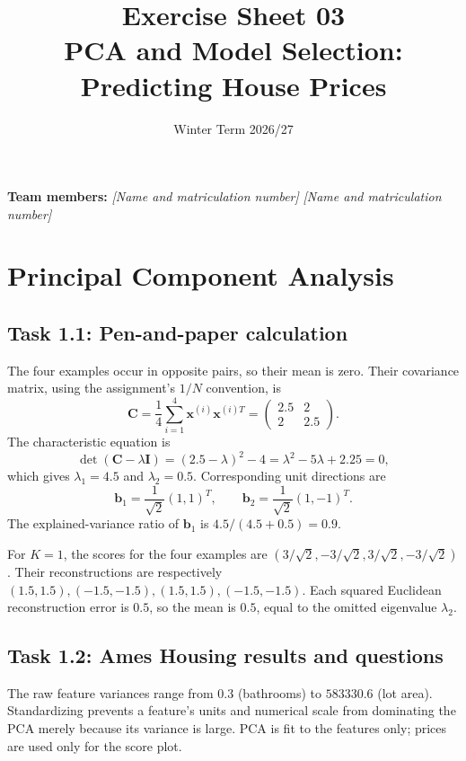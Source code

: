 \documentclass[10pt]{article}
\title{Exercise Sheet 03\\PCA and Model Selection: Predicting House Prices}
\author{}
\date{Winter Term 2026/27}
\begin{document}
\maketitle
\textbf{Team members:} \emph{[Name and matriculation number]} \qquad
\emph{[Name and matriculation number]}

\section{Principal Component Analysis}

\subsection{Task 1.1: Pen-and-paper calculation}

The four examples occur in opposite pairs, so their mean is zero. Their covariance matrix, using the assignment's $1/N$ convention, is
\[
\mathbf C=\frac14\sum_{i=1}^4\mathbf x^{(i)}\mathbf x^{(i)T}
=\begin{pmatrix}2.5&2\\2&2.5\end{pmatrix}.
\]
The characteristic equation is
\[
\det(\mathbf C-\lambda\mathbf I)=(2.5-\lambda)^2-4
=\lambda^2-5\lambda+2.25=0,
\]
which gives $\lambda_1=4.5$ and $\lambda_2=0.5$. Corresponding unit directions are
\[
\mathbf b_1=\frac{1}{\sqrt2}(1,1)^T,\qquad
\mathbf b_2=\frac{1}{\sqrt2}(1,-1)^T.
\]
The explained-variance ratio of $\mathbf b_1$ is $4.5/(4.5+0.5)=0.9$.

For $K=1$, the scores for the four examples are
$(3/\sqrt2,-3/\sqrt2,3/\sqrt2,-3/\sqrt2)$. Their reconstructions are respectively
$(1.5,1.5),(-1.5,-1.5),(1.5,1.5),(-1.5,-1.5)$.
Each squared Euclidean reconstruction error is $0.5$, so the mean is $0.5$,
equal to the omitted eigenvalue $\lambda_2$.

\subsection{Task 1.2: Ames Housing results and questions}

The raw feature variances range from $0.3$ (bathrooms) to $583330.6$
(lot area). Standardizing prevents a feature's units and numerical scale
from dominating the PCA merely because its variance is large. PCA is fit
to the features only; prices are used only for the score plot.
\end{document}
